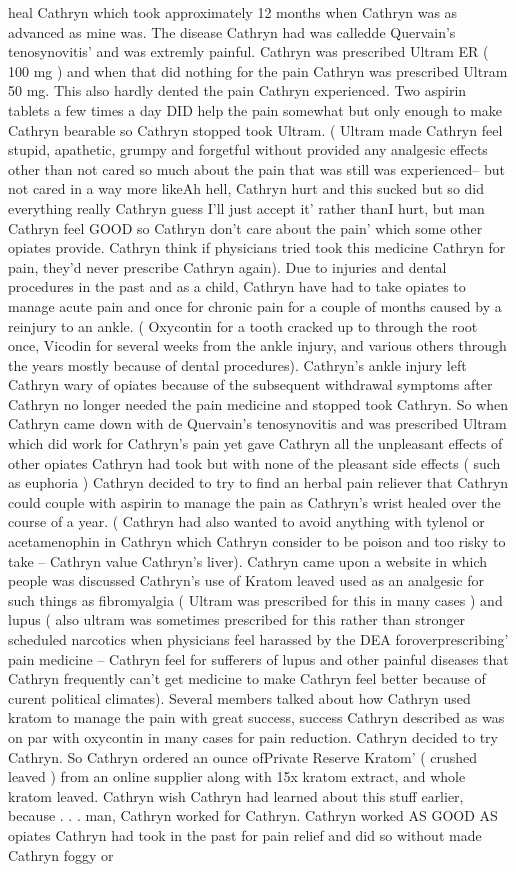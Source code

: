 \documentclass[12pt]{book}
\begin{document}
heal Cathryn which took approximately 12 months when Cathryn was as advanced as mine was. The disease Cathryn had was calledde Quervain's tenosynovitis' and was extremly painful. Cathryn was prescribed Ultram ER ( 100 mg ) and when that did nothing for the pain Cathryn was prescribed Ultram 50 mg. This also hardly dented the pain Cathryn experienced. Two aspirin tablets a few times a day DID help the pain somewhat but only enough to make Cathryn bearable so Cathryn stopped took Ultram. ( Ultram made Cathryn feel stupid, apathetic, grumpy and forgetful without provided any analgesic effects other than not cared so much about the pain that was still was experienced-- but not cared in a way more likeAh hell, Cathryn hurt and this sucked but so did everything really Cathryn guess I'll just accept it' rather thanI hurt, but man Cathryn feel GOOD so Cathryn don't care about the pain' which some other opiates provide. Cathryn think if physicians tried took this medicine Cathryn for pain, they'd never prescribe Cathryn again). Due to injuries and dental procedures in the past and as a child, Cathryn have had to take opiates to manage acute pain and once for chronic pain for a couple of months caused by a reinjury to an ankle. ( Oxycontin for a tooth cracked up to through the root once, Vicodin for several weeks from the ankle injury, and various others through the years mostly because of dental procedures). Cathryn's ankle injury left Cathryn wary of opiates because of the subsequent withdrawal symptoms after Cathryn no longer needed the pain medicine and stopped took Cathryn. So when Cathryn came down with de Quervain's tenosynovitis and was prescribed Ultram which did work for Cathryn's pain yet gave Cathryn all the unpleasant effects of other opiates Cathryn had took but with none of the pleasant side effects ( such as euphoria ) Cathryn decided to try to find an herbal pain reliever that Cathryn could couple with aspirin to manage the pain as Cathryn's wrist healed over the course of a year. ( Cathryn had also wanted to avoid anything with tylenol or acetamenophin in Cathryn which Cathryn consider to be poison and too risky to take -- Cathryn value Cathryn's liver). Cathryn came upon a website in which people was discussed Cathryn's use of Kratom leaved used as an analgesic for such things as fibromyalgia ( Ultram was prescribed for this in many cases ) and lupus ( also ultram was sometimes prescribed for this rather than stronger scheduled narcotics when physicians feel harassed by the DEA foroverprescribing' pain medicine -- Cathryn feel for sufferers of lupus and other painful diseases that Cathryn frequently can't get medicine to make Cathryn feel better because of curent political climates). Several members talked about how Cathryn used kratom to manage the pain with great success, success Cathryn described as was on par with oxycontin in many cases for pain reduction. Cathryn decided to try Cathryn. So Cathryn ordered an ounce ofPrivate Reserve Kratom' ( crushed leaved ) from an online supplier along with 15x kratom extract, and whole kratom leaved. Cathryn wish Cathryn had learned about this stuff earlier, because . . .  man, Cathryn worked for Cathryn. Cathryn worked AS GOOD AS opiates Cathryn had took in the past for pain relief and did so without made Cathryn foggy or 
\end{document}
